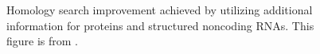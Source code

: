 \documentclass[custom,landscape,final,30pt,plainboxedsections]{sciposter-titleskipsmall}
\begin{document}
\begin{multicols}{3}
\begin{footnotesize}
\begin{figure}
\caption{
Homology search improvement achieved by utilizing additional
information for proteins and structured noncoding RNAs. This figure is
from \cite{Nawrocki13b}.}
\label{fig:examples}
\end{figure}
\end{footnotesize}


\end{multicols}
\end{document}
